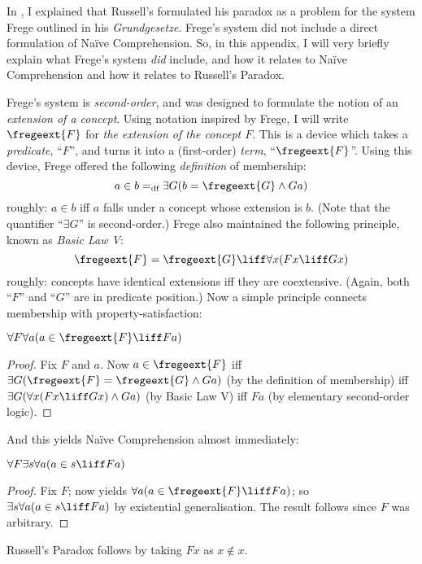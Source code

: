 \documentclass[../../../include/open-logic-section]{subfiles}
\begin{document}
In , I explained that Russell's formulated his paradox as a problem for the system Frege outlined in his \emph{Grundgesetze}. Frege's system did not include a direct formulation of Na\"{i}ve Comprehension. So, in this appendix, I will very briefly explain what Frege's system \emph{did} include, and how it relates to Na\"ive Comprehension and how it relates to Russell's Paradox.

Frege's system is \emph{second-order}, and was designed to formulate the notion of an \emph{extension of a concept}. Using notation inspired by Frege, I will write $\fregeext{F}$ for \emph{the extension of the concept $F$}. This is a device which takes a \emph{predicate}, ``$F$'', and turns it into a (first-order) \emph{term}, ``$\fregeext{F}$''. Using this device, Frege offered the following \emph{definition} of membership:
	$$a \in b =_\text{df} \exists G(b = \fregeext{G} \land Ga)$$
roughly: $a \in b$ iff $a$ falls under a concept whose extension is $b$. (Note that the quantifier ``$\exists G$'' is second-order.) Frege also maintained the following principle, known as \emph{Basic Law V}: 
$$\fregeext{F} = \fregeext{G} \liff \forall x (Fx \liff Gx)$$
roughly: concepts have identical extensions iff they are coextensive. (Again, both ``$F$'' and ``$G$'' are in predicate position.) Now a simple principle connects membership with property-satisfaction:
\begin{lem}
$\forall F \forall a(a \in \fregeext{F} \liff Fa)$
\end{lem}
\begin{proof} 
	Fix $F$ and $a$. Now $a \in \fregeext{F}$ iff $\exists G(\fregeext{F} = \fregeext{G} \land Ga)$ (by the definition of membership) iff $\exists G(\forall x(Fx \liff Gx) \land Ga)$ (by Basic Law V) iff $Fa$ (by elementary second-order logic).
\end{proof}\noindent
And this yields Na\"ive Comprehension almost immediately:
\begin{lem} $\forall F \exists s \forall a (a \in s \liff Fa)$
\end{lem}
\begin{proof}
	Fix $F$; now  yields $\forall a (a \in \fregeext{F} \liff Fa)$; so $\exists s\forall a(a \in s \liff Fa)$ by existential generalisation. The result follows since $F$ was arbitrary. 
\end{proof}\noindent
Russell's Paradox follows by taking $Fx$ as $x \notin x$. 
\end{document}
